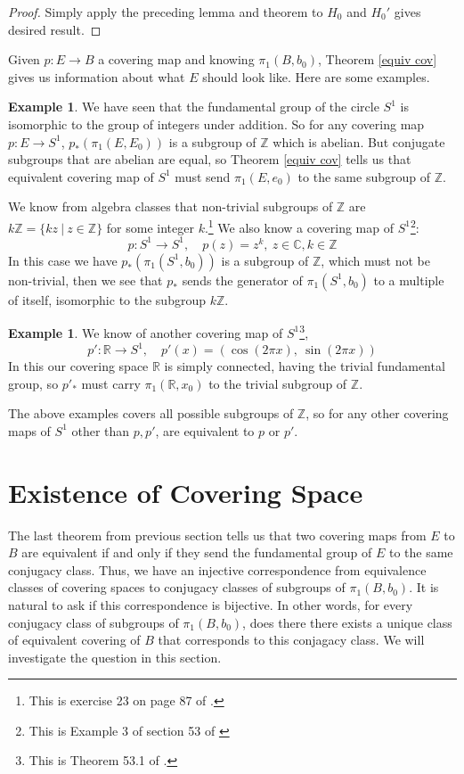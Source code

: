 \documentclass{amsart}
\theoremstyle{definition}
\newtheorem{example}[theorem]{Example}
\theoremstyle{remark}
\numberwithin{equation}{section}
\begin{document}
\begin{proof}
    Simply apply the preceding lemma and theorem to $H_0$ and $H_0'$ gives desired result.
\end{proof}

\noindent Given $p: E \rightarrow B$ a covering map and knowing $\pi_1(B, b_0)$, Theorem \ref{equiv cov} gives us information about what $E$ should look like. Here are some examples.

\begin{example}
    We have seen that the fundamental group of the circle $S^1$ is isomorphic to the group of integers under addition. So for any covering map $p: E \rightarrow S^1$, $p_\ast(\pi_1(E, E_0))$ is a subgroup of $\mathbb{Z}$ which is abelian. But conjugate subgroups that are abelian are equal, so Theorem \ref{equiv cov} tells us that equivalent covering map of $S^1$ must send $\pi_1(E, e_0)$ to the same subgroup of $\mathbb{Z}$.

    We know from algebra classes that non-trivial subgroups of $\mathbb{Z}$ are $k\mathbb{Z} = \{kz \ | \ z \in \mathbb{Z}\}$ for some integer $k$.\footnote{This is exercise 23 on page 87 of \cite{gal}.} We also know a covering map of $S^1$\footnote{This is Example 3 of section 53 of \cite{mun}}:
    $$p: S^1 \rightarrow S^1, \quad p(z) = z^k, \ z \in \mathbb{C}, k \in \mathbb{Z}$$
    In this case we have $p_\ast(\pi_1(S^1, b_0))$ is a subgroup of $\mathbb{Z}$, which must not be non-trivial, then we see that $p_\ast$ sends the generator of $\pi_1(S^1, b_0)$ to a multiple of itself, isomorphic to the subgroup $k\mathbb{Z}$.
\end{example}

\begin{example}
    We know of another covering map of $S^1$\footnote{This is Theorem 53.1 of \cite{mun}.},
    $$p': \mathbb{R} \rightarrow S^1, \quad p'(x) = (\cos(2\pi x), \ \sin(2 \pi x))$$
    In this our covering space $\mathbb{R}$ is simply connected, having the trivial fundamental group, so $p'_\ast$ must carry $\pi_1(\mathbb{R}, x_0)$ to the trivial subgroup of $\mathbb{Z}$.
\end{example}

The above examples covers all possible subgroups of $\mathbb{Z}$, so for any other covering maps of $S^1$ other than $p, p'$, are equivalent to $p$ or $p'$.

\section{Existence of Covering Space}
\noindent The last theorem from previous section tells us that two covering maps from $E$ to $B$ are equivalent if and only if they send the fundamental group of $E$ to the same conjugacy class. Thus, we have an injective correspondence from equivalence classes of covering spaces to conjugacy classes of subgroups of $\pi_1(B, b_0)$. It is natural to ask if this correspondence is bijective. In other words, for every conjugacy class of subgroups of $\pi_1(B, b_0)$, does there there exists a unique class of equivalent covering of $B$ that corresponds to this conjagacy class. We will investigate the question in this section.
\end{document}
